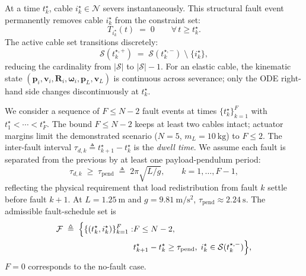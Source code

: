 \documentclass[lettersize,journal]{IEEEtran}
\newcommand{\vect}[1]{\boldsymbol{#1}}
\newcommand{\mat}[1]{\boldsymbol{#1}}
\begin{document}
At a time $t_k^\star$, cable $i_k^\star \in \mathcal{N}$ severs instantaneously. This structural fault event permanently removes cable $i_k^\star$ from the constraint set:
\begin{equation}
 T_{i_k^\star}(t) \;=\; 0
  \qquad \forall\, t \ge t_k^\star.
  \label{eq:fault-tension-zero}
\end{equation}
The active cable set transitions discretely:
\begin{equation}
  \mathcal{S}(t_k^{\star,+}) \;=\; \mathcal{S}(t_k^{\star,-})
    \;\setminus\; \{i_k^\star\},
  \label{eq:S-transition}
\end{equation}
reducing the cardinality from $|\mathcal{S}|$ to $|\mathcal{S}| - 1$. For an elastic cable, the kinematic state $(\vect p_i, \vect v_i, \mat R_i, \vect\omega_i, \vect p_L, \vect v_L)$ is continuous across severance; only the ODE right-hand side changes discontinuously at $t_k^\star$.

We consider a sequence of $F \le N-2$ fault events at times $\{t_k^\star\}_{k=1}^F$ with $t_1^\star < \cdots < t_F^\star$. The bound $F \le N-2$ keeps at least two cables intact; actuator margins limit the demonstrated scenario ($N = 5$, $m_L = \SI{10}{\kilo\gram}$) to $F \le 2$. The inter-fault interval $\tau_{d,k} \triangleq t_{k+1}^\star - t_k^\star$ is the \emph{dwell time}. We assume each fault is separated from the previous by at least one payload-pendulum period:
\begin{equation}
  \tau_{d,k} \;\ge\; \tau_{\mathrm{pend}} \;\triangleq\;
    2\pi\sqrt{L/g}, \qquad k = 1, \dots, F-1,
  \label{eq:dwell-assumption}
\end{equation}
reflecting the physical requirement that load redistribution from fault $k$ settle before fault $k+1$. At $L = \SI{1.25}{\metre}$ and $g = \SI{9.81}{\metre\per\second\squared}$, $\tau_{\mathrm{pend}} \approx \SI{2.24}{\second}$. The admissible fault-schedule set is
\begin{align}
\label{eq:fault-schedule-set}
  \mathcal{F} \;\triangleq\;
    \Bigl\{
      \{(t_k^\star, i_k^\star)\}_{k=1}^F :
 &F \le N-2,\;\\
 &t_{k+1}^\star - t_k^\star \ge \tau_{\mathrm{pend}},\;
 i_k^\star \in \mathcal{S}(t_k^{\star,-})
    \Bigr\},\nonumber
\end{align}
$F = 0$ corresponds to the no-fault case.
\end{document}
